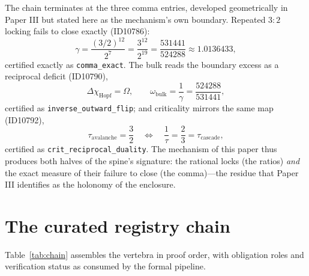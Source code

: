 \documentclass[11pt]{article}
\theoremstyle{remark}
\begin{document}
The chain terminates at the three comma entries, developed geometrically in Paper III but stated here as the mechanism's own boundary. Repeated $3{:}2$ locking fails to close exactly (ID10786):
\begin{equation}
\gamma = \frac{(3/2)^{12}}{2^7} = \frac{3^{12}}{2^{19}} = \frac{531441}{524288} \approx 1.0136433,
\label{eq:comma}
\end{equation}
certified exactly as \texttt{comma\_exact}. The bulk reads the boundary excess as a reciprocal deficit (ID10790),
\begin{equation}
\Delta\chi_{\mathrm{Hopf}} = \Omega, \qquad \omega_{\mathrm{bulk}} = \frac{1}{\gamma} = \frac{524288}{531441},
\end{equation}
certified as \texttt{inverse\_outward\_flip}; and criticality mirrors the same map (ID10792),
\begin{equation}
\tau_{\mathrm{avalanche}} = \frac{3}{2} \quad \Longleftrightarrow \quad \frac{1}{\tau} = \frac{2}{3} = \tau_{\mathrm{cascade}},
\end{equation}
certified as \texttt{crit\_reciprocal\_duality}. The mechanism of this paper thus produces both halves of the spine's signature: the rational locks (the ratios) \emph{and} the exact measure of their failure to close (the comma)---the residue that Paper III identifies as the holonomy of the enclosure.

\section{The curated registry chain}
\label{sec:chain}

Table~\ref{tab:chain} assembles the vertebra in proof order, with obligation roles and verification status as consumed by the formal pipeline.
\end{document}
